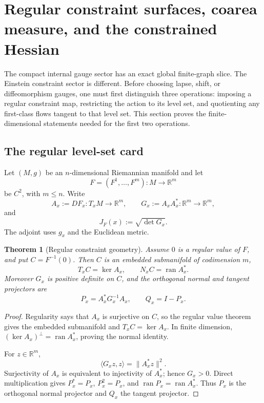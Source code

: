 \documentclass[11pt]{article}
\newtheorem{theorem}{Theorem}[section]
\begin{document}
\section{Regular constraint surfaces, coarea measure, and the constrained
Hessian}
\label{sec:v11v47}

The compact internal gauge sector has an exact global finite-graph
slice.  The Einstein constraint sector is different.  Before choosing
lapse, shift, or diffeomorphism gauges, one must first distinguish
three operations: imposing a regular constraint map, restricting the
action to its level set, and quotienting any first-class flows tangent
to that level set.  This section proves the finite-dimensional
statements needed for the first two operations.

\subsection{The regular level-set card}

Let \((M,g)\) be an \(n\)-dimensional Riemannian manifold and let
\[
                         F=(F^1,\ldots,F^m):M\to\mathbb R^m   \tag{47.1}
\]
be \(C^2\), with \(m\le n\).  Write
\[
 A_x:=D F_x:T_xM\to\mathbb R^m,\qquad
 G_x:=A_xA_x^*:\mathbb R^m\to\mathbb R^m,                     \tag{47.2}
\]
and
\[
                           J_F(x):=\sqrt{\det G_x}.            \tag{47.3}
\]
The adjoint uses \(g_x\) and the Euclidean metric.

\begin{theorem}[Regular constraint geometry]
\label{thm:v11v47-regular}
Assume \(0\) is a regular value of \(F\), and put
\(C=F^{-1}(0)\).  Then \(C\) is an embedded submanifold of codimension
\(m\),
\[
          T_xC=\ker A_x,\qquad N_xC=\operatorname{ran}A_x^*.  \tag{47.4}
\]
Moreover \(G_x\) is positive definite on \(C\), and the orthogonal
normal and tangent projectors are
\[
 P_x=A_x^*G_x^{-1}A_x,\qquad Q_x=I-P_x.                       \tag{47.5}
\]
\end{theorem}

\begin{proof}
Regularity says that \(A_x\) is surjective on \(C\), so the regular
value theorem gives the embedded submanifold and
\(T_xC=\ker A_x\).  In finite dimension,
\((\ker A_x)^\perp=\operatorname{ran}A_x^*\), proving the normal
identity.

For \(z\in\mathbb R^m\),
\[
                  \langle G_xz,z\rangle=\lVert A_x^*z\rVert^2.
\]
Surjectivity of \(A_x\) is equivalent to injectivity of \(A_x^*\);
hence \(G_x>0\).  Direct multiplication gives
\(P_x^*=P_x\), \(P_x^2=P_x\), and
\(\operatorname{ran}P_x=\operatorname{ran}A_x^*\).
Thus \(P_x\) is the orthogonal normal projector and \(Q_x\) the tangent
projector.
\end{proof}
\end{document}
